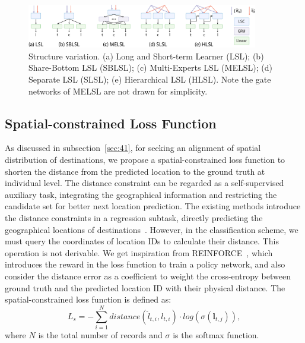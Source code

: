 \documentclass[sigconf]{acmart}
\begin{document}
    
    
\begin{figure}[bt]
    \begin{center}
    \includegraphics[width=0.9\textwidth]{figure/variation.pdf}
    \end{center}
    \caption{Structure variation. (a) Long and Short-term Learner (LSL); (b) Share-Bottom LSL (SBLSL); (c) Multi-Experts LSL (MELSL); (d) Separate LSL (SLSL); (e) Hierarchical LSL (HLSL). Note the gate networks of MELSL are not drawn for simplicity.}
    \label{fig:variation}
\end{figure}    


\subsection{Spatial-constrained Loss Function}

    As discussed in subsection~\ref{sec:41}, for seeking an alignment of spatial distribution of destinations, we propose a spatial-constrained loss function to shorten the distance from the predicted location to the ground truth at individual level. The distance constraint can be regarded as a self-supervised auxiliary task, integrating the geographical information and restricting the candidate set for better next location prediction. 
    The existing methods introduce the distance constraints in a regression subtask, directly predicting the geographical locations of destinations~\cite{xue2021mobtcast}. 
    However, in the classification scheme, we must query the coordinates of location IDs to calculate their distance. This operation is not derivable. 
    We get inspiration from REINFORCE~\cite{williams1992simple}, which introduces the reward in the loss function to train a policy network, and also consider the distance error as a coefficient to weight the cross-entropy between ground truth and the predicted location ID with their physical distance. 
    The spatial-constrained loss function is defined as:
    \begin{equation}
        L_s = - \sum^{N}_{i=1} distance(\hat{l}_{t,i}, l_{t,i}) \cdot log(\sigma(\boldsymbol{l}_{t,j})),
    \end{equation}
    where $N$ is the total number of records and $\sigma$ is the softmax function.
\end{document}
